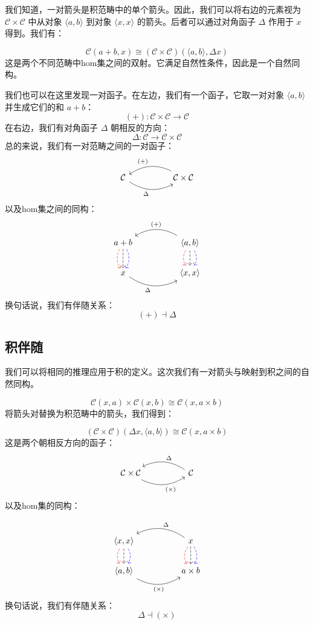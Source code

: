 \documentclass[DaoFP]{subfiles}
\begin{document}
我们知道，一对箭头是积范畴中的单个箭头。因此，我们可以将右边的元素视为 $\mathcal{C} \times \mathcal{C}$ 中从对象 $\langle a, b \rangle$ 到对象 $\langle x, x \rangle$ 的箭头。后者可以通过对角函子 $\Delta$ 作用于 $x$ 得到。我们有：

\[  \mathcal{C} (a + b, x) \cong (\mathcal{C} \times \mathcal{C})( \langle a, b \rangle , \Delta x)\]
这是两个不同范畴中hom集之间的双射。它满足自然性条件，因此是一个自然同构。

我们也可以在这里发现一对函子。在左边，我们有一个函子，它取一对对象 $\langle a, b \rangle$ 并生成它们的和 $a + b$：
\[ (+) \colon \mathcal{C} \times \mathcal{C} \to \mathcal{C}\]
在右边，我们有对角函子 $\Delta$ 朝相反的方向：
\[ \Delta \colon \mathcal{C} \to  \mathcal{C} \times \mathcal{C} \]
总的来说，我们有一对范畴之间的一对函子：
\[
 \begin{tikzcd}
  \mathcal{C}
   \arrow[rr, bend right, "\Delta"']
  &&
  \mathcal{C} \times \mathcal{C}
 \arrow[ll, bend right, "(+)"']
  \end{tikzcd}
\]
以及hom集之间的同构：
\[
 \begin{tikzcd}
a + b
\arrow[d, bend right, red, dashed]
\arrow[d, dashed]
\arrow[d, bend left, blue, dashed]
  &&
 \langle a , b \rangle
\arrow[d, bend right, red, dashed]
\arrow[d, dashed]
\arrow[d, bend left, blue, dashed]
 \arrow[ll, bend right, "(+)"']
 \\
 x
   \arrow[rr, bend right, "\Delta"']
 &&
 \langle x, x \rangle
  \end{tikzcd}
\]
换句话说，我们有伴随关系：
\[ (+) \dashv \Delta \]


\subsection{积伴随}

我们可以将相同的推理应用于积的定义。这次我们有一对箭头与映射到积之间的自然同构。

\[  \mathcal{C} (x, a) \times \mathcal{C}(x, b) \cong  \mathcal{C} (x, a \times b)  \]
将箭头对替换为积范畴中的箭头，我们得到：

\[  (\mathcal{C} \times \mathcal{C})( \Delta x,  \langle a, b \rangle ) \cong  \mathcal{C} (x, a \times b)  \]
这是两个朝相反方向的函子：
\[
 \begin{tikzcd}
  \mathcal{C} \times \mathcal{C}
  \arrow[rr, bend right, "(\times)"']
  &&
  \mathcal{C}
  \arrow[ll, bend right, "\Delta"']
  \end{tikzcd}
\]
以及hom集的同构：

\[
 \begin{tikzcd}
 \langle x, x \rangle
\arrow[d, bend right, red, dashed]
\arrow[d, dashed]
\arrow[d, bend left, blue, dashed]
  &&
  x
\arrow[d, bend right, red, dashed]
\arrow[d, dashed]
\arrow[d, bend left, blue, dashed]
 \arrow[ll, bend right, "\Delta"']
 \\
 \langle a , b \rangle
   \arrow[rr, bend right, "(\times)"']
 &&
 a \times b
  \end{tikzcd}
\]
换句话说，我们有伴随关系：
\[ \Delta \dashv (\times) \]
\end{document}
